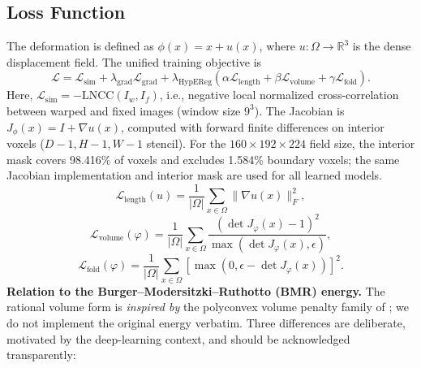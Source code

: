 \documentclass[11pt,a4paper]{article}
\begin{document}
\subsection{Loss Function}
\label{sec:loss}
The deformation is defined as \(\phi(x)=x+u(x)\), where \(u:\Omega\rightarrow\mathbb{R}^3\) is the dense displacement field. The unified training objective is
\begin{equation}
\mathcal{L}
=
\mathcal{L}_{\mathrm{sim}}
+
\lambda_{\mathrm{grad}}\mathcal{L}_{\mathrm{grad}}
+
\lambda_{\mathrm{HypEReg}}\left(
\alpha \mathcal{L}_{\mathrm{length}} + \beta \mathcal{L}_{\mathrm{volume}} + \gamma \mathcal{L}_{\mathrm{fold}}
\right).
\end{equation}
Here, \(\mathcal{L}_{\mathrm{sim}}=-\mathrm{LNCC}(I_w,I_f)\), i.e., negative local normalized cross-correlation between warped and fixed images (window size \(9^3\)). The Jacobian is \(J_{\phi}(x)=I+\nabla u(x)\), computed with forward finite differences on interior voxels (\(D-1,H-1,W-1\) stencil). For the \(160\times192\times224\) field size, the interior mask covers 98.416\% of voxels and excludes 1.584\% boundary voxels; the same Jacobian implementation and interior mask are used for all learned models.
\begin{equation}
\mathcal{L}_{\mathrm{length}}(u)=\frac{1}{|\Omega|}\sum_{x\in\Omega}\|\nabla u(x)\|_F^2,
\end{equation}
\begin{equation}
\mathcal{L}_{\mathrm{volume}}(\varphi)=\frac{1}{|\Omega|}\sum_{x\in\Omega}\frac{(\det J_{\varphi}(x)-1)^2}{\max(\det J_{\varphi}(x),\epsilon)},
\end{equation}
\begin{equation}
\mathcal{L}_{\mathrm{fold}}(\varphi)=\frac{1}{|\Omega|}\sum_{x\in\Omega}\left[\max(0,\epsilon-\det J_{\varphi}(x))\right]^2.
\end{equation}
\noindent\textbf{Relation to the Burger--Modersitzki--Ruthotto (BMR) energy.}
The rational volume form is \emph{inspired by} the polyconvex volume penalty family of \citet{burger2013hyperelastic}; we do not implement the original energy verbatim. Three differences are deliberate, motivated by the deep-learning context, and should be acknowledged transparently:
\end{document}
